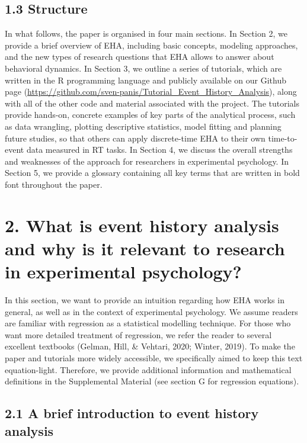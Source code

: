 \documentclass[
  english,
  man, donotrepeattitle,floatsintext]{apa6}
\begin{document}
\subsection{1.3 Structure}\label{structure}

In what follows, the paper is organised in four main sections. In Section 2, we provide a brief overview of EHA, including basic concepts, modeling approaches, and the new types of research questions that EHA allows to answer about behavioral dynamics.
In Section 3, we outline a series of tutorials, which are written in the R programming language and publicly available on our Github page (\url{https://github.com/sven-panis/Tutorial_Event_History_Analysis}), along with all of the other code and material associated with the project. The tutorials provide hands-on, concrete examples of key parts of the analytical process, such as data wrangling, plotting descriptive statistics, model fitting and planning future studies, so that others can apply discrete-time EHA to their own time-to-event data measured in RT tasks.
In Section 4, we discuss the overall strengths and weaknesses of the approach for researchers in experimental psychology.
In Section 5, we provide a glossary containing all key terms that are written in bold font throughout the paper.

\section{2. What is event history analysis and why is it relevant to research in experimental psychology?}\label{what-is-event-history-analysis-and-why-is-it-relevant-to-research-in-experimental-psychology}

In this section, we want to provide an intuition regarding how EHA works in general, as well as in the context of experimental psychology. We assume readers are familiar with regression as a statistical modelling technique. For those who want more detailed treatment of regression, we refer the reader to several excellent textbooks (Gelman, Hill, \& Vehtari, 2020; Winter, 2019). To make the paper and tutorials more widely accessible, we specifically aimed to keep this text equation-light. Therefore, we provide additional information and mathematical definitions in the Supplemental Material (see section G for regression equations).

\subsection{2.1 A brief introduction to event history analysis}\label{a-brief-introduction-to-event-history-analysis}
\end{document}
